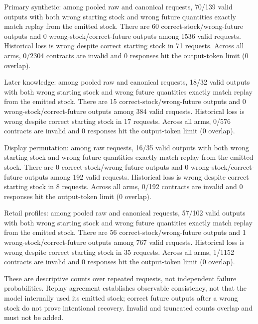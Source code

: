 Primary synthetic: among pooled raw and canonical requests, 70/139 valid outputs with both wrong starting stock and wrong future quantities exactly match replay from the emitted stock. There are 60 correct-stock/wrong-future outputs and 0 wrong-stock/correct-future outputs among 1536 valid requests. Historical loss is wrong despite correct starting stock in 71 requests. Across all arms, 0/2304 contracts are invalid and 0 responses hit the output-token limit (0 overlap).

Later knowledge: among pooled raw and canonical requests, 18/32 valid outputs with both wrong starting stock and wrong future quantities exactly match replay from the emitted stock. There are 15 correct-stock/wrong-future outputs and 0 wrong-stock/correct-future outputs among 384 valid requests. Historical loss is wrong despite correct starting stock in 17 requests. Across all arms, 0/576 contracts are invalid and 0 responses hit the output-token limit (0 overlap).

Display permutation: among raw requests, 16/35 valid outputs with both wrong starting stock and wrong future quantities exactly match replay from the emitted stock. There are 0 correct-stock/wrong-future outputs and 0 wrong-stock/correct-future outputs among 192 valid requests. Historical loss is wrong despite correct starting stock in 8 requests. Across all arms, 0/192 contracts are invalid and 0 responses hit the output-token limit (0 overlap).

Retail profiles: among pooled raw and canonical requests, 57/102 valid outputs with both wrong starting stock and wrong future quantities exactly match replay from the emitted stock. There are 56 correct-stock/wrong-future outputs and 1 wrong-stock/correct-future outputs among 767 valid requests. Historical loss is wrong despite correct starting stock in 35 requests. Across all arms, 1/1152 contracts are invalid and 0 responses hit the output-token limit (0 overlap).

These are descriptive counts over repeated requests, not independent failure probabilities. Replay agreement establishes observable consistency, not that the model internally used its emitted stock; correct future outputs after a wrong stock do not prove intentional recovery. Invalid and truncated counts overlap and must not be added.
